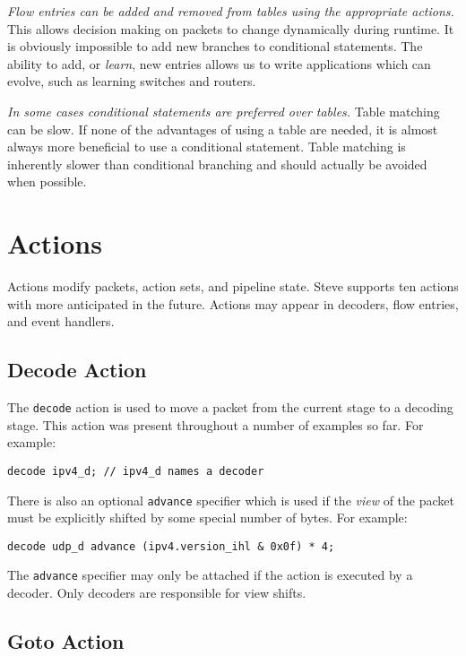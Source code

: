 \textit{Flow entries can be added and removed from tables using the appropriate
actions.} This allows decision making on packets to change dynamically during
runtime. It is obviously impossible to add new branches to conditional
statements. The ability to add, or \textit{learn}, new entries allows us to
write applications which can evolve, such as learning switches and routers.

\textit{In some cases conditional statements are preferred over tables.} 
Table matching can be slow. If none of the advantages of using a table are 
needed, it is almost always more beneficial to use a conditional statement. Table 
matching is inherently slower than conditional branching and should actually be 
avoided when possible.

\section{Actions} \label{tut:action}

Actions modify packets, action sets, and pipeline state. Steve supports ten
actions with more anticipated in the future. Actions may appear in decoders,
flow entries, and event handlers.

\subsection{Decode Action} \label{tut:decode_action}

The \texttt{decode} action is used to move a packet from the current stage to a
decoding stage. This action was present throughout a number of examples so far.
For example:

\begin{lstlisting}
decode ipv4_d; // ipv4_d names a decoder
\end{lstlisting}

There is also an optional \texttt{advance} specifier which is used if
the \textit{view} of the packet must be explicitly shifted by some special
number of bytes. For example:

\begin{lstlisting}
decode udp_d advance (ipv4.version_ihl & 0x0f) * 4;
\end{lstlisting}

The \texttt{advance} specifier may only be attached if the action is executed by a
decoder. Only decoders are responsible for view shifts.

\subsection{Goto Action} \label{tut:goto_action}

